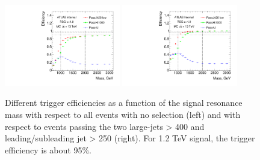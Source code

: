 \begin{figure}[htbp!]
\begin{center}
  \includegraphics[width=0.45\textwidth,angle=-90]{figures/boosted/Trigger/app_trig_b77_Efficiency_PreSel.pdf}
  \includegraphics[width=0.45\textwidth,angle=-90]{figures/boosted/Trigger/app_trig_b77_Efficiency_All.pdf}
  \caption{Different trigger efficiencies as a function of the signal resonance mass with respect to all events with no selection (left) and with respect to events passing the two large-\R jets \pt > 400 \GeV and leading/subleading jet \pt > 250 \GeV (right). For 1.2 TeV signal, the trigger efficiency is about 95\%.}
  \label{fig:boosted-trigger-HLT}
\end{center}
\end{figure}

\label{evt-sel:trig}
